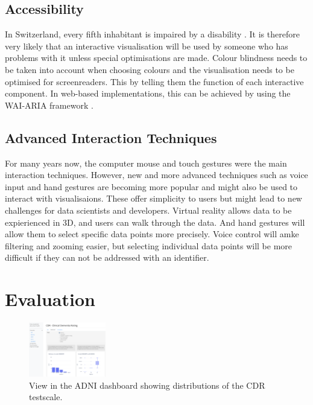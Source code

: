 \documentclass[11pt]{article}
\begin{document}
\subsection{Accessibility}

In Switzerland, every fifth inhabitant is impaired by a disability \parencite{federal_statistical_office_persons_2019}. It is therefore very likely that an interactive visualisation will be used by someone who has problems with it unless special optimisations are made. Colour blindness needs to be taken into account when choosing colours and the visualisation needs to be optimised for screenreaders. This by telling them the function of each interactive component. In web-based implementations, this can be achieved by using the WAI-ARIA framework \parencite{nurthen_wai-aria_2022}.

\subsection{Advanced Interaction Techniques}

For many years now, the computer mouse and touch gestures were the main interaction techniques. However, new and more advanced techniques such as voice input and hand gestures are becoming more popular and might also be used to interact with visualisaions. These offer simplicity to users but might lead to new challenges for data scientists and developers. Virtual reality allows data to be expierienced in 3D, and users can walk through the data. And hand gestures will allow them to select specific data points more precisely. Voice control will amke filtering and zooming easier, but selecting individual data points will be more difficult if they can not be addressed with an identifier.

\pagebreak
\section{Evaluation}

\begin{figure}
    \includegraphics[width=0.3\textwidth]{./adni-cdr.png}
    \caption{View in the ADNI dashboard showing distributions of the CDR testscale.}
    \label{adni-cdr}
\end{figure}
\end{document}
